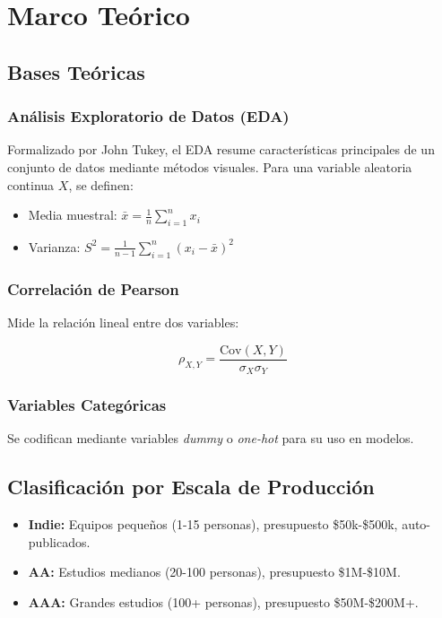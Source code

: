 \documentclass[oneside,11pt]{Latex/Classes/PhDthesisPSnPDF}
\begin{document}
\chapter{Marco Teórico}

\section{Bases Teóricas}

\subsection{Análisis Exploratorio de Datos (EDA)}

Formalizado por John Tukey, el EDA resume características principales de
un conjunto de datos mediante métodos visuales. Para una variable
aleatoria continua \(X\), se definen:

\begin{itemize}
  \item Media muestral: $\bar{x} = \frac{1}{n} \sum_{i=1}^{n} x_i$
  \item Varianza: $S^{2} = \frac{1}{n-1} \sum_{i=1}^{n} (x_i - \bar{x})^{2}$
\end{itemize}

\subsection{Correlación de Pearson}

Mide la relación lineal entre dos variables:

\[\rho_{X,Y} = \frac{\text{Cov}(X,Y)}{\sigma_X \sigma_Y}\]

\subsection{Variables Categóricas}

Se codifican mediante variables \textit{dummy} o \textit{one-hot} para
su uso en modelos.

\section{Clasificación por Escala de Producción}

\begin{itemize}
  \item \textbf{Indie:} Equipos pequeños (1-15 personas), presupuesto \$50k-\$500k, auto-publicados.
  \item \textbf{AA:} Estudios medianos (20-100 personas), presupuesto \$1M-\$10M.
  \item \textbf{AAA:} Grandes estudios (100+ personas), presupuesto \$50M-\$200M+.
\end{itemize}
\end{document}
